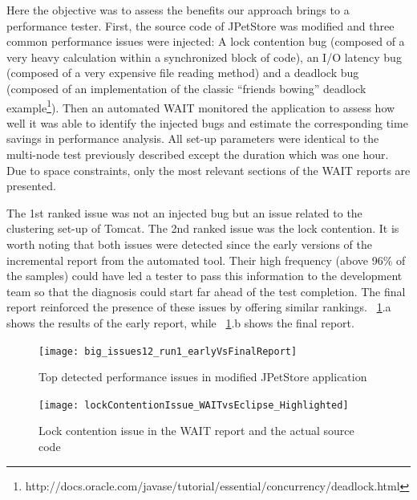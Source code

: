 \documentclass[runningheads,a4paper]{llncs}
\begin{document}

Here the objective was to assess the benefits our approach brings to a
performance tester. First, the source code of JPetStore was modified and three
common performance issues were injected: A lock contention bug (composed of a
very heavy calculation within a synchronized block of code), an I/O latency bug
(composed of a very expensive file reading method) and a deadlock bug (composed of 
an implementation of the classic ``friends bowing'' deadlock
example\footnote{http://docs.oracle.com/javase/tutorial/essential/concurrency/deadlock.html}).
Then an automated WAIT monitored the application to assess how well it was able
to identify the injected bugs and estimate the corresponding time savings in performance
analysis. All set-up parameters were identical to the multi-node test previously 
described except the duration which was one hour. Due to space
constraints, only the most relevant sections of the WAIT reports are presented.

The 1st ranked issue was not an injected bug but an issue related to the
clustering set-up of Tomcat.
The 2nd ranked issue was the lock
contention. It is worth noting that both issues were
detected since the early versions of the incremental report from the
automated tool. Their high frequency (above 96\% of the samples) could have
led a tester to pass this information to the development team so that the diagnosis could start far ahead
of the test completion. The final report reinforced the presence of these issues 
by offering similar rankings. \figurename ~\ref{fig_run1_bugs12}.a shows the
results of the early report, while ~\ref{fig_run1_bugs12}.b shows the final report.

\begin{figure}[!h]
\centering
\texttt{[image: big\_issues12\_run1\_earlyVsFinalReport]}
\caption{Top detected performance issues in modified JPetStore application}
\label{fig_run1_bugs12}
\end{figure}

\begin{figure}[!h]
\centering
\texttt{[image: lockContentionIssue\_WAITvsEclipse\_Highlighted]}
\caption{Lock contention issue in the WAIT report and the actual source code}
\label{fig_issue2_vs_code}
\end{figure}
\end{document}
